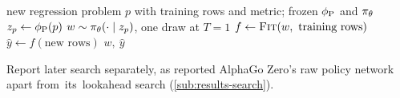 \begin{algorithm}[!htb]
\caption{\textbf{Proposed game-day protocol (\searchone).}}\label{alg:gameday}
\begin{algorithmic}[1]
\Require new regression problem $p$ with training rows and metric; frozen $\phi_{\mathrm{P}}$ and $\pi_{\theta}$
\State $z_p \gets \phi_{\mathrm{P}}(p)$ 
\State $w \sim \pi_{\theta}(\cdot\mid z_p)$, one draw at $T=1$ 
\State $f \gets \textsc{Fit}(w,\ \text{training rows})$ 
\State $\hat{y} \gets f(\text{new rows})$ 
\State \Return $w,\ \hat{y}$
\end{algorithmic}
\end{algorithm}

Report later search separately, as \citet{silver2017mastering} reported
AlphaGo Zero's raw policy network apart \mbox{from its lookahead} search (\cref{sub:results-search}).

